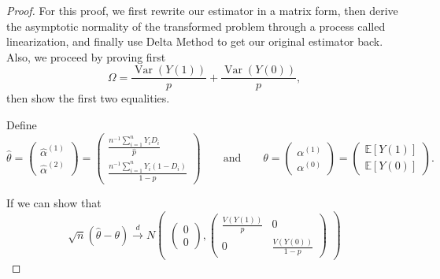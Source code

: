 \documentclass[11pt,a4paper]{amsart}
\theoremstyle{plain}
\theoremstyle{definition}
\begin{document}
	\begin{proof}
		For this proof, we first rewrite our estimator in a matrix form, then derive the asymptotic normality of the transformed problem through a process called linearization, and finally use Delta Method to get our original estimator back. Also, we proceed by proving first 
		\[	\Omega = \frac{\operatorname{Var}(Y(1))}{p} + \frac{\operatorname{Var}(Y(0))}{p},	\]
		then show the first two equalities. \par
		Define 
		\[	\hat{\theta}  = \begin{pmatrix}
		\hat{\alpha}^{(1)} \\
		\hat{\alpha}^{(2)}
		\end{pmatrix} = \begin{pmatrix}
		\frac{n^{-1}\sum_{i = 1}^{n}Y_{i}D_{i}}{\hat{p}}\\
		\frac{n^{-1}\sum_{i = 1}^{n}Y_{i}(1-D_{i})}{1-\hat{p}}
		\end{pmatrix} \qquad \text{and} \qquad
		\theta = \begin{pmatrix}
		\alpha^{(1)} \\
		\alpha^{(0)}
		\end{pmatrix}
		=\begin{pmatrix}
		\mathbb{E}[Y(1)] \\
		\mathbb{E}[Y(0)]
		\end{pmatrix} .
			\]
			
		If we can show that 
		\begin{equation}\label{matrix form, asym. RCT}
		\sqrt{n}(\hat{\theta} - \theta) \stackrel{d}{\longrightarrow} N\begin{pmatrix}
		\begin{pmatrix}
		0 \\
		0
		\end{pmatrix}
		, \begin{pmatrix}
		\frac{V(Y(1))}{p} & 0 \\
		0 & \frac{V(Y(0))}{1-p} 
		\end{pmatrix}
		\end{pmatrix}
		\end{equation}
		

\end{proof}
\end{document}
